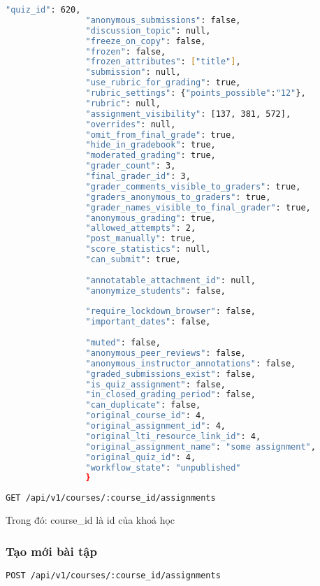 \documentclass[../Thesis.tex]{subfiles}
\begin{document}
\begin{lstlisting}[language=bash]
                "quiz_id": 620,
                "anonymous_submissions": false,
                "discussion_topic": null,
                "freeze_on_copy": false,
                "frozen": false,
                "frozen_attributes": ["title"],
                "submission": null,
                "use_rubric_for_grading": true,
                "rubric_settings": {"points_possible":"12"},
                "rubric": null,
                "assignment_visibility": [137, 381, 572],
                "overrides": null,
                "omit_from_final_grade": true,
                "hide_in_gradebook": true,
                "moderated_grading": true,
                "grader_count": 3,
                "final_grader_id": 3,
                "grader_comments_visible_to_graders": true,
                "graders_anonymous_to_graders": true,
                "grader_names_visible_to_final_grader": true,
                "anonymous_grading": true,
                "allowed_attempts": 2,
                "post_manually": true,
                "score_statistics": null,
                "can_submit": true,
                
                "annotatable_attachment_id": null,
                "anonymize_students": false,
                
                "require_lockdown_browser": false,
                "important_dates": false,
                
                "muted": false,
                "anonymous_peer_reviews": false,
                "anonymous_instructor_annotations": false,
                "graded_submissions_exist": false,
                "is_quiz_assignment": false,
                "in_closed_grading_period": false,
                "can_duplicate": false,
                "original_course_id": 4,
                "original_assignment_id": 4,
                "original_lti_resource_link_id": 4,
                "original_assignment_name": "some assignment",
                "original_quiz_id": 4,
                "workflow_state": "unpublished"
                }
                \end{lstlisting}

            \begin{lstlisting}[language=bash]
                GET /api/v1/courses/:course_id/assignments
            \end{lstlisting}

            Trong đó: course\_id là id của khoá học

            \subsubsection{Tạo mới bài tập}
            \begin{lstlisting}[language=bash]
                POST /api/v1/courses/:course_id/assignments
            \end{lstlisting}
\end{document}
